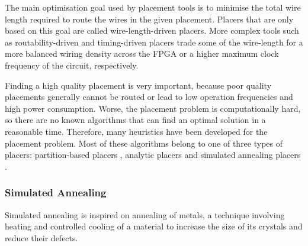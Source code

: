 \documentclass[a4paper,oneside,12pt]{article}
\begin{document}
The main optimisation goal used by placement tools is to minimise the total wire length required to route the wires in the given placement. Placers that are only based on this goal are called wire-length-driven placers. More complex tools such as routability-driven \cite{swartz1998afrrff} and timing-driven placers \cite{marquardt2000tpff} trade some of the wire-length for
a more balanced wiring density across the FPGA or a higher maximum clock frequency of the circuit, respectively. 

Finding a high quality placement is very important, because poor  quality placements generally cannot be routed or lead to low operation frequencies and high power consumption. Worse, the placement problem is computationally hard, so there are no known algorithms that can find an optimal solution in a reasonable time. Therefore, many heuristics have been developed for the placement problem. Most of these algorithms belong to one of three types of placers: partition-based placers \cite{maidee2005tppfisf}, analytic placers \cite{chan2003ppffga} and simulated annealing placers \cite{betz1997vanppartffr}. 


\subsubsection{Simulated Annealing}
Simulated annealing \cite{kirkpatrick1983obsa} is inspired on annealing of metals, a technique involving heating and controlled cooling of a material to increase the size of its crystals and reduce their defects.
\end{document}
